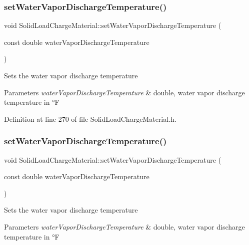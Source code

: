 \subsubsection{\texorpdfstring{set\+Water\+Vapor\+Discharge\+Temperature()}{setWaterVaporDischargeTemperature()}\hspace{0.1cm}{\footnotesize\ttfamily [2/3]}}
{\footnotesize\ttfamily void Solid\+Load\+Charge\+Material\+::set\+Water\+Vapor\+Discharge\+Temperature (\begin{DoxyParamCaption}\item[{const double}]{water\+Vapor\+Discharge\+Temperature }\end{DoxyParamCaption})\hspace{0.3cm}{\ttfamily [inline]}}

Sets the water vapor discharge temperature 
\begin{DoxyParams}{Parameters}
{\em water\+Vapor\+Discharge\+Temperature} & double, water vapor discharge temperature in °F \\
\hline
\end{DoxyParams}


Definition at line 270 of file Solid\+Load\+Charge\+Material.\+h.

\mbox{\label{class_solid_load_charge_material_af7837868e494c16aba5a2c3e1220106d}} 
\subsubsection{\texorpdfstring{set\+Water\+Vapor\+Discharge\+Temperature()}{setWaterVaporDischargeTemperature()}\hspace{0.1cm}{\footnotesize\ttfamily [3/3]}}
{\footnotesize\ttfamily void Solid\+Load\+Charge\+Material\+::set\+Water\+Vapor\+Discharge\+Temperature (\begin{DoxyParamCaption}\item[{const double}]{water\+Vapor\+Discharge\+Temperature }\end{DoxyParamCaption})\hspace{0.3cm}{\ttfamily [inline]}}

Sets the water vapor discharge temperature 
\begin{DoxyParams}{Parameters}
{\em water\+Vapor\+Discharge\+Temperature} & double, water vapor discharge temperature in °F \\
\hline
\end{DoxyParams}



